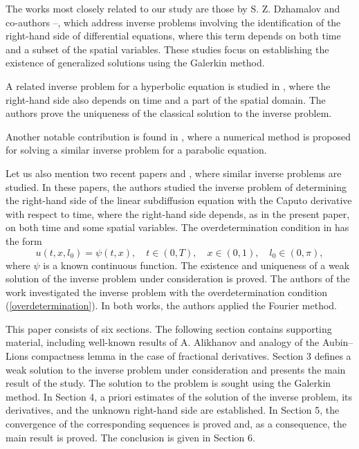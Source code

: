 \documentclass[12pt]{amsart}
\theoremstyle{definition}
\numberwithin{equation}{section}
\begin{document}
The works most closely related to our study are those by S. Z. Dzhamalov and co-authors \cite{Djamalov1}–\cite{Djamalov3}, which address inverse problems involving the identification of the right-hand side of differential equations, where this term depends on both time and a subset of the spatial variables. These studies focus on establishing the existence of generalized solutions using the Galerkin method. 

A related inverse problem for a hyperbolic equation is studied in \cite{Fikret}, where the right-hand side also depends on time and a part of the spatial domain. The authors prove the uniqueness of the classical solution to the inverse problem.

Another notable contribution is found in \cite{XiaomaoDeng}, where a numerical method is proposed for solving a similar inverse problem for a parabolic equation.

Let us also mention two recent papers \cite{AshurovMuhiddinovanew} and \cite{AshurovMuhiddinovanew1}, where similar inverse problems are studied. In these papers, the authors studied the inverse problem of determining the right-hand side of the linear subdiffusion equation with the Caputo derivative with respect to time, where the right-hand side depends, as in the present paper, on both time and some spatial variables. The overdetermination condition in \cite{AshurovMuhiddinovanew} has the form
\begin{equation}\label{l_0}
u(t, x, l_0) = \psi(t, x), \quad t \in (0, T), \quad x \in (0, 1), \quad l_0 \in (0, \pi),
\end{equation}
where \( \psi \) is a known continuous function.
The existence and uniqueness of a weak solution of the inverse problem under consideration is proved. The authors of the work \cite{AshurovMuhiddinovanew1} investigated the inverse problem with the overdetermination condition (\ref{overdetermination}). In both works, the authors applied the Fourier method.



This paper consists of six sections. The following section contains supporting material, including well-known results of A. Alikhanov and analogy of the Aubin–Lions compactness lemma in the case of fractional
derivatives. Section 3 defines a weak solution to the inverse problem under consideration and presents the main result of the study. The solution to the problem is sought using the Galerkin method. In Section 4, a priori estimates of the solution of the inverse problem, its derivatives, and the unknown right-hand side are established. In Section 5, the convergence of the corresponding sequences is proved and, as a consequence, the main result is proved. The conclusion is given in Section 6.
\end{document}
